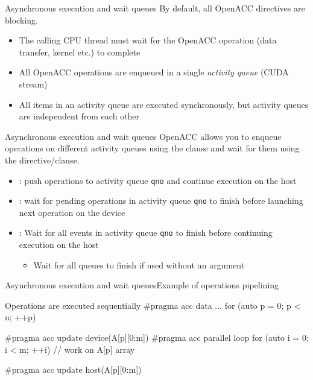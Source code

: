 \documentclass[12pt,aspectratio=169]{beamer}
\begin{document}
\begin{frame}{Asynchronous execution and wait queues}
  By default, all OpenACC directives are blocking.
  \vspace\baselineskip
  \begin{itemize}
  \item The calling CPU thread must wait for the OpenACC operation (data
    transfer, kernel etc.) to complete
  \item All OpenACC operations are enqueued in a single \emph{activity queue} (CUDA stream)
  \item All items in an activity queue are executed synchronously, but activity queues are independent from each other
  \end{itemize}
\end{frame}

\begin{frame}{Asynchronous execution and wait queues}
  OpenACC allows you to enqueue operations on different activity queues using the  clause and wait for them using the  directive/clause.
  \vfill
  \begin{itemize}
  \item {}: push operations to activity queue \texttt{qno} and continue execution on the host
  \item {}: wait for pending operations in activity queue \texttt{qno} to finish before launching next operation on the device
  \item {}: Wait for all events in activity queue \texttt{qno} to finish before continuing execution on the host
    \begin{itemize}
    \item Wait for all queues to finish if used without an argument
    \end{itemize}
  \end{itemize}
\end{frame}

\begin{frame}[fragile]{Asynchronous execution and wait queues}{Example of operations pipelining}
  \begin{Cpplisting}{Operations are executed sequentially}
#pragma acc data ...
for (auto p = 0; p < n; ++p) {
    #pragma acc update device(A[p][0:m])
    #pragma acc parallel loop
    for (auto i = 0; i < m; ++i) {
        // work on A[p] array
    }

    #pragma acc update host(A[p][0:m])
}
  \end{Cpplisting}
\end{frame}
\end{document}
